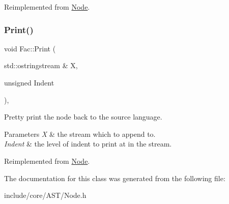 Reimplemented from \mbox{\hyperlink{class_node_a27ad1ba81d2596817b361368282bcbfa}{Node}}.

\mbox{\label{class_fac_abf645b3e9acdc88dd83ed3dacf981c58}} 
\subsubsection{\texorpdfstring{Print()}{Print()}}
{\footnotesize\ttfamily void Fac\+::\+Print (\begin{DoxyParamCaption}\item[{std\+::ostringstream \&}]{X,  }\item[{unsigned}]{Indent }\end{DoxyParamCaption})\hspace{0.3cm}{\ttfamily [override]}, {\ttfamily [virtual]}}

Pretty print the node back to the source language. 
\begin{DoxyParams}{Parameters}
{\em X} & the stream which to append to. \\
\hline
{\em Indent} & the level of indent to print at in the stream. \\
\hline
\end{DoxyParams}


Reimplemented from \mbox{\hyperlink{class_node_a5325b760a6e6fe94227c0cff53af2c45}{Node}}.



The documentation for this class was generated from the following file\+:\begin{DoxyCompactItemize}
\item 
include/core/\+A\+S\+T/Node.\+h\end{DoxyCompactItemize}
